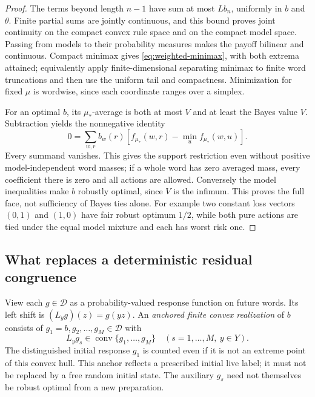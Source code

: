 \begin{proof}
The terms beyond length $n-1$ have sum at most $Lb_n$, uniformly in $b$ and $\theta$. Finite partial sums are jointly continuous, and this bound proves joint continuity on the compact convex rule space and on the compact model space. Passing from models to their probability measures makes the payoff bilinear and continuous. Compact minimax gives \eqref{eq:weighted-minimax}, with both extrema attained; equivalently apply finite-dimensional separating minimax to finite word truncations and then use the uniform tail and compactness. Minimization for fixed $\mu$ is wordwise, since each coordinate ranges over a simplex.

For an optimal $b$, its $\mu_*$-average is both at most $V$ and at least the Bayes value $V$. Subtraction yields the nonnegative identity
\[
 0=\sum_{w,r}b_w(r)
       [f_{\mu_*}(w,r)-\min_u f_{\mu_*}(w,u)].
\]
Every summand vanishes. This gives the support restriction even without positive model-independent word masses; if a whole word has zero averaged mass, every coefficient there is zero and all actions are allowed. Conversely the model inequalities make $b$ robustly optimal, since $V$ is the infimum. This proves the full face, not sufficiency of Bayes ties alone. For example two constant loss vectors $(0,1)$ and $(1,0)$ have fair robust optimum $1/2$, while both pure actions are tied under the equal model mixture and each has worst risk one.
\end{proof}

\subsection{What replaces a deterministic residual congruence}
View each $g\in\mathcal D$ as a probability-valued response function on future words. Its left shift is $(L_yg)(z)=g(yz)$. An \emph{anchored finite convex realization} of $b$ consists of $g_1=b,g_2,\ldots,g_M\in\mathcal D$ with
\begin{equation}\label{eq:convex-invariance}
 L_yg_s\in\operatorname{conv}\{g_1,\ldots,g_M\}
       \quad(s=1,\ldots,M,\ y\in Y).
\end{equation}
The distinguished initial response $g_1$ is counted even if it is not an extreme point of this convex hull. This anchor reflects a prescribed initial live label; it must not be replaced by a free random initial state. The auxiliary $g_s$ need not themselves be robust optimal from a new preparation.

